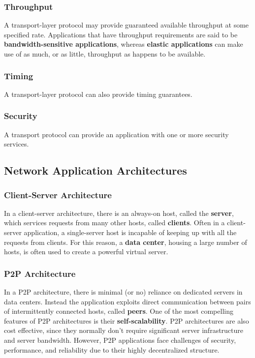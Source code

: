 \documentclass[11pt]{article}
\begin{document}
\subsubsection{Throughput}

A transport-layer protocol may provide guaranteed available throughput at some specified rate. Applications that have throughput requirements are said to be \textbf{bandwidth-sensitive applications}, whereas \textbf{elastic applications} can make use of as much, or as little, throughput as happens to be available.

\subsubsection{Timing}

A transport-layer protocol can also provide timing guarantees.

\subsubsection{Security}

A transport protocol can provide an application with one or more security services.

\subsection{Network Application Architectures}

\subsubsection{Client-Server Architecture}

In a client-server architecture, there is an always-on host, called the \textbf{server}, which services requests from many other hosts, called \textbf{clients}. Often in a client-server application, a single-server host is incapable of keeping up with all the requests from clients. For this reason, a \textbf{data center}, housing a large number of hosts, is often used to create a powerful virtual server. 

\subsubsection{P2P Architecture}

In a P2P architecture, there is minimal (or no) reliance on dedicated servers in data centers. Instead the application exploits direct communication between pairs of intermittently connected hosts, called \textbf{peers}. One of the most compelling features of P2P architectures is their \textbf{self-scalability}. P2P architectures are also cost effective, since they normally don’t require significant server infrastructure and server bandwidth. However, P2P applications face challenges of security, performance, and reliability due to their highly decentralized structure.
\end{document}

